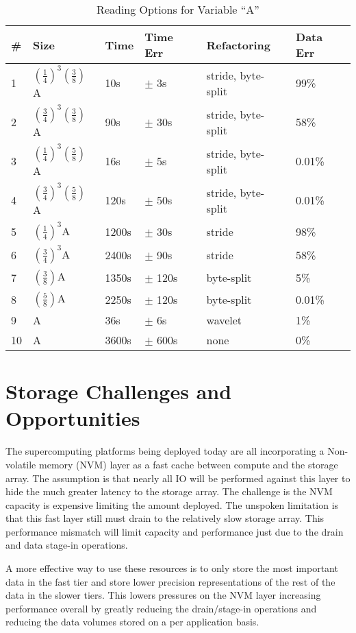 \documentclass[letterpaper,twocolumn,10pt]{article}
\begin{document}
\begin{table}[tbp]
\centering
\caption{Reading Options for Variable ``A''}
\label{tab:results}
\begin{tabular}{|l|l|l|l|l|l|}
\hline
\# & Size & Time & Time Err & Refactoring & Data Err\\
\hline
1 & $(\frac{1}{4})^3(\frac{3}{8})$A & 10s & $\pm$ 3s & stride, byte-split & 99\% \\
\hline
2 & $(\frac{3}{4})^3(\frac{3}{8})$A & 90s & $\pm$ 30s & stride, byte-split & 58\% \\
\hline
3 & $(\frac{1}{4})^3(\frac{5}{8})$A & 16s & $\pm$ 5s & stride, byte-split & 0.01\% \\
\hline
4 & $(\frac{3}{4})^3(\frac{5}{8})$A & 120s & $\pm$ 50s & stride, byte-split & 0.01\% \\
\hline
\hline
5 & $(\frac{1}{4})^3$A & 1200s & $\pm$ 30s & stride & 98\% \\
\hline
6 & $(\frac{3}{4})^3$A & 2400s & $\pm$ 90s & stride & 58\% \\
\hline
\hline
7 & $(\frac{3}{8})$A & 1350s & $\pm$ 120s & byte-split & 5\% \\
\hline
8 & $(\frac{5}{8})$A & 2250s & $\pm$ 120s & byte-split & 0.01\% \\
\hline
\hline
9 & A & 36s & $\pm$ 6s & wavelet & 1\% \\
\hline
\hline
10 & A & 3600s & $\pm$ 600s & none & 0\% \\
\hline
\end{tabular}
\end{table}


\section{Storage Challenges and Opportunities}
\label{sec:storage}

The supercomputing platforms being deployed today are all incorporating a
Non-volatile memory (NVM) layer as a fast cache between compute and the storage
array. The assumption is that nearly all IO will be performed against this
layer to hide the much greater latency to the storage array. The challenge is
the NVM capacity is expensive limiting the amount deployed. The unspoken
limitation is that this fast layer still must drain to the relatively slow
storage array. This performance mismatch will limit capacity and performance
just due to the drain and data stage-in operations.

A more effective way to use these resources is to only store the most
important data in the fast tier and store lower precision representations of
the rest of the data in the slower tiers. This lowers pressures on the NVM
layer increasing performance overall by greatly reducing the drain/stage-in
operations and reducing the data volumes stored on a per application basis.
\end{document}

